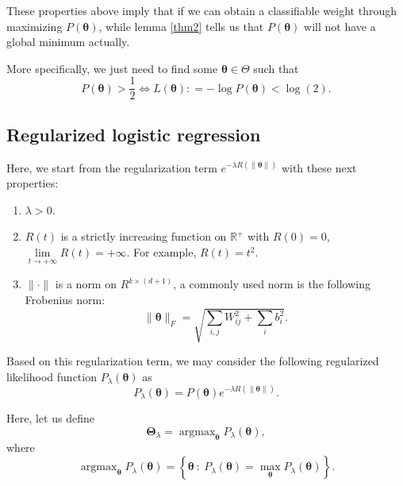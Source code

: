 These properties above imply that if we can obtain a classifiable weight through maximizing $P(\bm\theta)$, while lemma \ref{thm2} tells us that $P(\bm\theta)$ will not have a global minimum actually.

More specifically, we just need to find some $\bm \theta \in \Theta$ such that
\begin{equation}\label{key}
P(\bm \theta) > \frac{1}{2} \Leftrightarrow  L(\bm \theta) : = -\log P(\bm \theta )  < \log(2).
\end{equation}

\blankpage
\break
\subsection{Regularized logistic regression}
Here, we start from the regularization term $e^{-\lambda R(\|\bm\theta\|)}$ with 
these next properties:
\begin{enumerate}
	\item $\lambda > 0$.
	\item $R(t)$ is a strictly increasing function on $\mathbb{R}^+$ with $R(0) = 0$, $\lim\limits_{t\rightarrow +\infty} R(t) = +\infty$.
	For example, $R(t) = t^2$.
	\item $\|\cdot\|$ is a norm on $R^{k\times(d+1)}$, a commonly used norm  is the 
	following Frobenius norm: 
	\begin{equation}\label{key}
	\|\bm \theta\|_F = \sqrt{\sum_{i,j}W_{ij}^2 + \sum_i b_i^2}.
	\end{equation}
\end{enumerate}

Based on this regularization term,  we may consider the following 
regularized likelihood function $P_\lambda(\bm\theta)$ as 
\begin{equation}\label{key}
 P_\lambda(\bm\theta) = P(\bm\theta)e^{-\lambda R(\|\bm\theta\|)}.
\end{equation}


Here, let us define 
\begin{equation}\label{key}
\bm\Theta_{\lambda} = \mathop{{\arg\max}}_{\bm\theta}  P_\lambda(\bm\theta),
\end{equation}
where 
\begin{equation}\label{key}
\mathop{\arg\max}_{\bm\theta}  P_\lambda(\bm\theta) = \left\{\bm \theta ~:~ P_\lambda(\bm \theta) = \max_{\bm \theta} P_\lambda(\bm \theta) \right\}.
\end{equation}


